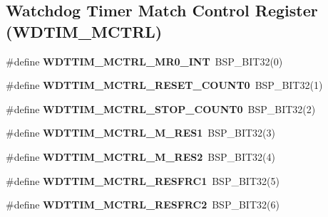 \subsection*{Watchdog Timer Match Control Register (W\+D\+T\+I\+M\+\_\+\+M\+C\+T\+RL)}
\begin{DoxyCompactItemize}
\item 
\mbox{\label{group__lpc32xx__reg_ga571f5a2019c31dac7e48dfd3541c6bde}} 
\#define {\bfseries W\+D\+T\+T\+I\+M\+\_\+\+M\+C\+T\+R\+L\+\_\+\+M\+R0\+\_\+\+I\+NT}~B\+S\+P\+\_\+\+B\+I\+T32(0)
\item 
\mbox{\label{group__lpc32xx__reg_gaad9f1e98839d827d9a62267b10ec475c}} 
\#define {\bfseries W\+D\+T\+T\+I\+M\+\_\+\+M\+C\+T\+R\+L\+\_\+\+R\+E\+S\+E\+T\+\_\+\+C\+O\+U\+N\+T0}~B\+S\+P\+\_\+\+B\+I\+T32(1)
\item 
\mbox{\label{group__lpc32xx__reg_ga04d19c58889abc76bf97a9956a03eb58}} 
\#define {\bfseries W\+D\+T\+T\+I\+M\+\_\+\+M\+C\+T\+R\+L\+\_\+\+S\+T\+O\+P\+\_\+\+C\+O\+U\+N\+T0}~B\+S\+P\+\_\+\+B\+I\+T32(2)
\item 
\mbox{\label{group__lpc32xx__reg_ga7ddef4bfe7a5bc07a1aa96350d31c2be}} 
\#define {\bfseries W\+D\+T\+T\+I\+M\+\_\+\+M\+C\+T\+R\+L\+\_\+\+M\+\_\+\+R\+E\+S1}~B\+S\+P\+\_\+\+B\+I\+T32(3)
\item 
\mbox{\label{group__lpc32xx__reg_ga080b82077904b63c2a545684e8f03c1b}} 
\#define {\bfseries W\+D\+T\+T\+I\+M\+\_\+\+M\+C\+T\+R\+L\+\_\+\+M\+\_\+\+R\+E\+S2}~B\+S\+P\+\_\+\+B\+I\+T32(4)
\item 
\mbox{\label{group__lpc32xx__reg_ga528892aa78dce1645b6cdb481ea5fafc}} 
\#define {\bfseries W\+D\+T\+T\+I\+M\+\_\+\+M\+C\+T\+R\+L\+\_\+\+R\+E\+S\+F\+R\+C1}~B\+S\+P\+\_\+\+B\+I\+T32(5)
\item 
\mbox{\label{group__lpc32xx__reg_gac5d14c8cc9b1e453bb84b4cab97ef914}} 
\#define {\bfseries W\+D\+T\+T\+I\+M\+\_\+\+M\+C\+T\+R\+L\+\_\+\+R\+E\+S\+F\+R\+C2}~B\+S\+P\+\_\+\+B\+I\+T32(6)
\end{DoxyCompactItemize}
